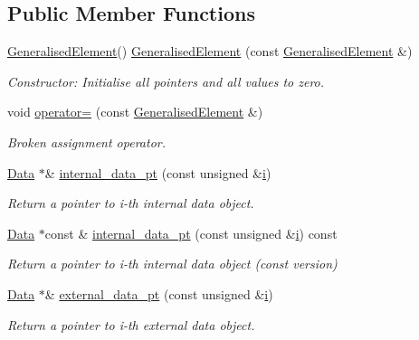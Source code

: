 \subsection*{Public Member Functions}
\begin{DoxyCompactItemize}
\item 
\hyperlink{classoomph_1_1GeneralisedElement}{Generalised\+Element}() \hyperlink{classoomph_1_1GeneralisedElement_a245bc1dfb2667394ecd7597a00d1f46f}{Generalised\+Element} (const \hyperlink{classoomph_1_1GeneralisedElement}{Generalised\+Element} \&)
\begin{DoxyCompactList}\small\item\em Constructor\+: Initialise all pointers and all values to zero. \end{DoxyCompactList}\item 
void \hyperlink{classoomph_1_1GeneralisedElement_a180a0684a2b174f0396b97f247eb629f}{operator=} (const \hyperlink{classoomph_1_1GeneralisedElement}{Generalised\+Element} \&)
\begin{DoxyCompactList}\small\item\em Broken assignment operator. \end{DoxyCompactList}\item 
\hyperlink{classoomph_1_1Data}{Data} $\ast$\& \hyperlink{classoomph_1_1GeneralisedElement_a45e32d895d4b3686e0f15fe455f4ed44}{internal\+\_\+data\+\_\+pt} (const unsigned \&\hyperlink{cfortran_8h_adb50e893b86b3e55e751a42eab3cba82}{i})
\begin{DoxyCompactList}\small\item\em Return a pointer to i-\/th internal data object. \end{DoxyCompactList}\item 
\hyperlink{classoomph_1_1Data}{Data} $\ast$const  \& \hyperlink{classoomph_1_1GeneralisedElement_a21ff163046aeaab67983e4c862a78d17}{internal\+\_\+data\+\_\+pt} (const unsigned \&\hyperlink{cfortran_8h_adb50e893b86b3e55e751a42eab3cba82}{i}) const
\begin{DoxyCompactList}\small\item\em Return a pointer to i-\/th internal data object (const version) \end{DoxyCompactList}\item 
\hyperlink{classoomph_1_1Data}{Data} $\ast$\& \hyperlink{classoomph_1_1GeneralisedElement_a3ec4e27a7a3d16122b00e2b5be0d1036}{external\+\_\+data\+\_\+pt} (const unsigned \&\hyperlink{cfortran_8h_adb50e893b86b3e55e751a42eab3cba82}{i})
\begin{DoxyCompactList}\small\item\em Return a pointer to i-\/th external data object. \end{DoxyCompactList}\item 

\end{DoxyCompactItemize}
